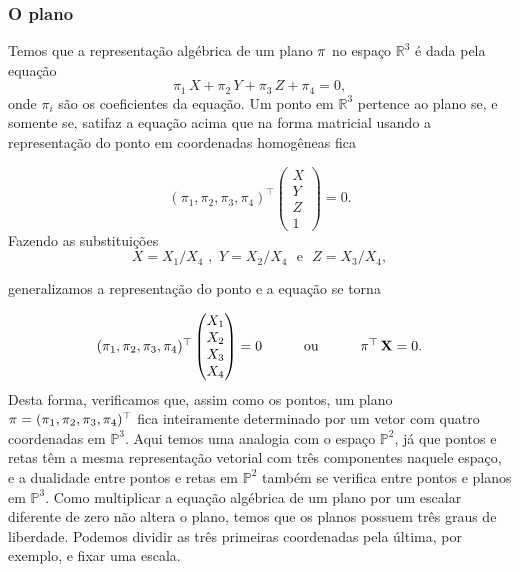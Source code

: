  

\subsubsection*{O plano}

Temos que a representação algébrica de um plano $\pi$ no espaço $\mathbb{R}^3$ é dada pela equação
\begin{equation*}
\pi_1\,X+\pi_2\,Y+\pi_3\,Z+\pi_4=0,
\end{equation*}
onde $\pi_i$ são os coeficientes da equação. Um ponto em $\mathbb{R}^3$ pertence ao plano se, e somente se, satifaz a equação acima que na forma matricial usando a representação do ponto em coordenadas homogêneas fica

\begin{equation*}
  (\pi_1,\pi_2,\pi_3,\pi_4)^\top
 \begin{pmatrix}
  X\\
  Y\\
  Z\\
  1
  \end{pmatrix}
 = 0.
\end{equation*}
Fazendo as substituições 
\begin{equation*}
X=X_1/X_4 \,\, , \,\, Y=X_2/X_4 \,\,\,\, \text{e} \,\,\,\, Z=X_3/X_4 ,
\end{equation*}

generalizamos a representação do ponto e a equação se torna

\begin{equation*}
\begin{array}{ccc}
(\pi_1,\pi_2,\pi_3,\pi_4)^\top
  \begin{pmatrix}
  X_1\\
  X_2\\
  X_3\\
  X_4
  \end{pmatrix}
  = 0
& \qquad \text{ou} \qquad
& \pi^\top \, \mathbf{X} = 0.
\end{array}
\end{equation*}
Desta forma, verificamos que, assim como os pontos, um plano $\pi = (\pi_1,\pi_2,\pi_3,\pi_4)^\top$ fica inteiramente determinado por um vetor com quatro coordenadas em $\mathbb{P}^3$. Aqui temos uma analogia com o espaço $\mathbb{P}^2$, já que pontos e retas têm a mesma representação vetorial com três componentes naquele espaço, e a dualidade entre pontos e retas em $\mathbb{P}^2$ também se verifica entre pontos e planos em $\mathbb{P}^3$. Como multiplicar a equação algébrica de um plano por um escalar diferente de zero não altera o plano, temos que os planos possuem três graus de liberdade. Podemos dividir as três primeiras coordenadas pela última, por exemplo, e fixar uma escala.

